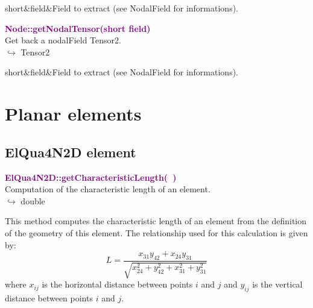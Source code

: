 \begin{tcolorbox}[width=\textwidth,myArgs,tabularx={ll|R},title=Arguments of Node::getNodalSymTensor]
short&field&Field to extract (see NodalField for informations).
\end{tcolorbox}


\textcolor{purple}{\textbf{Node::getNodalTensor(short field)}}\label{Node::getNodalTensor(short field)}\\
Get back a nodalField Tensor2.\\ \hspace*{10mm}$\hookrightarrow$ Tensor2

\begin{tcolorbox}[width=\textwidth,myArgs,tabularx={ll|R},title=Arguments of Node::getNodalTensor]
short&field&Field to extract (see NodalField for informations).
\end{tcolorbox}


\section{Planar elements}

\subsection{ElQua4N2D element}

\textcolor{purple}{\textbf{ElQua4N2D::getCharacteristicLength(~)}}\label{ElQua4N2D::getCharacteristicLength()}\\
Computation of the characteristic length of an element.\\ \hspace*{10mm}$\hookrightarrow$ double

This method computes the characteristic length of an element from the definition of the geometry of this element.
The relationship used for this calculation is given by:
\begin{equation}
L=\frac{x_{31} y_{42}+x_{24} y_{31}}{\sqrt{x_{24}^2+y_{42}^2+x_{31}^2+y_{31}^2}}
\end{equation}
where $x_{ij}$ is the horizontal distance between points $i$ and $j$ and $y_{ij}$ is the vertical distance between points $i$ and $j$.


